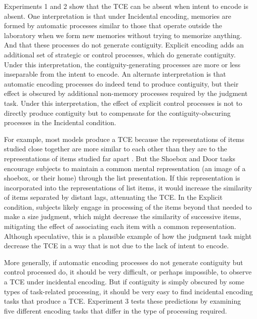 \documentclass[jou,natbib]{apa6} %
\begin{document}
Experiments 1 and 2 show that the TCE can be absent when intent to encode is absent. One interpretation is that under Incidental encoding, memories are formed by automatic processes similar to those that operate outside the laboratory when we form new memories without trying to memorize anything. And that these processes do not generate contiguity. Explicit encoding adds an additional set of strategic or control processes, which do generate contiguity. Under this interpretation, the contiguity-generating processes are more or less inseparable from the intent to encode. An alternate interpretation is that automatic encoding processes do indeed tend to produce contiguity, but their effect is obscured by additional non-memory processes required by the judgment task. Under this interpretation, the effect of explicit control processes is not to directly produce contiguity but to compensate for the contiguity-obscuring processes in the Incidental condition. 

For example, most models produce a TCE because the representations of items studied close together are more similar to each other than they are to the representations of items studied far apart  \citep{HealEtal16}. But the Shoebox and Door tasks encourage subjects to maintain a common mental representation (an image of a shoebox, or their home) through the list presentation. If this representation is incorporated into the representations of list items, it would increase the similarity of items separated by distant lags, attenuating the TCE. In the Explicit condition, subjects likely engage in processing of the items beyond that needed to make a size judgment, which might decrease the similarity of successive items, mitigating the effect of associating each item with a common representation. Although speculative, this is a plausible example of how the judgment task might decrease the TCE in a way that is not due to the lack of intent to encode.      

More generally, if automatic encoding processes do not generate contiguity but control processed do, it should be very difficult, or perhaps impossible, to observe a TCE under incidental encoding. But if contiguity is simply obscured by some types of task-related processing, it should be very easy to find incidental encoding tasks that produce a TCE. Experiment 3 tests these predictions by examining five different encoding tasks that differ in the type of processing required.  


\end{document}

